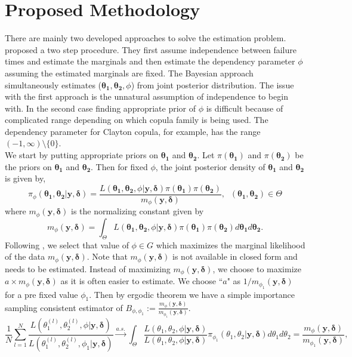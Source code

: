\documentclass[11pt]{article}
\theoremstyle{remboldstyle}
\newcommand{\y}{{\boldsymbol{y}}}
\newcommand{\de}{{\boldsymbol{\delta}}}
\begin{document}
\section{Proposed Methodology}
\label{sec:method}
\noindent
There are mainly two developed approaches to solve the estimation problem. \cite{shih:louis:1995} proposed a two step procedure.  They first assume independence between failure times and estimate the marginals and then estimate the dependency parameter $\phi$ assuming the estimated marginals are fixed. The Bayesian approach simultaneously estimates ($\mathbf{\theta_1}, \mathbf{\theta_2}, \phi$) from joint posterior distribution. The issue with the first approach is the unnatural assumption of independence to begin with. In the second case finding appropriate prior of $\phi$  is difficult because of complicated range depending on which copula family is being used. The dependency parameter for Clayton copula, for example, has the range $ (-1, \infty)\setminus \{0\}$. \\
We start by putting appropriate priors on $\mathbf{\theta_1}$ and $\mathbf{\theta_2}$. Let $\pi(\mathbf{\theta_1})$ and $\pi(\mathbf{\theta_2})$ be the priors on $\mathbf{\theta_1}$ and $\mathbf{\theta_2}$. Then for fixed $\phi$, the joint posterior density of $\mathbf{\theta_1}$ and $\mathbf{\theta_2}$ is given by,
\begin{equation}
  \label{eq:post}
  \pi_\phi(\mathbf{\theta_1}, \mathbf{\theta_2} | \y, \de) = \frac{L(\mathbf{\theta_1}, \mathbf{\theta_2}, \phi| \y, \de) \pi(\mathbf{\theta_1})
\pi(\mathbf{\theta_2})}{m_{\phi}(\y, \de)}, \;\;(\mathbf{\theta_1}, \mathbf{\theta_2}) \in \Theta
\end{equation}
where $m_{\phi}(\y, \de)$ is the normalizing constant given by
\[
m_{\phi}(\y, \de) = \int_{\Theta} L(\mathbf{\theta_1}, \mathbf{\theta_2}, \phi| \y, \de) \pi(\mathbf{\theta_1})\pi(\mathbf{\theta_2}) d\mathbf{\theta_1} d\mathbf{\theta_2}.
\]
Following \cite{roy:2014}, we select that value of $\phi \in G$ which maximizes the marginal likelihood of the data $m_{\phi}(\y, \de)$. Note that $m_{\phi}(\y, \de)$ is not available in closed form and needs to be estimated. Instead of maximizing $m_{\phi}(\y, \de)$, we choose to maximize $a \times m_{\phi}(\y, \de)$ as it is often easier to estimate. We choose ``$a$" as $1/m_{\phi_1}(\y, \de)$ for a pre fixed value $\phi_1$. Then by ergodic theorem we have a simple importance sampling consistent estimator of $B_{\phi,\phi_1}:= \frac{m_{\phi}(\y, \de)}{m_{\phi_1}(\y, \de)}$.
\begin{equation}
  \label{eq:simbf}
\frac{1}{N} \sum_{l=1}^N \frac{L(\theta_1^{(l)}, \theta_2^{(l)}, \phi| \y, \de)}{L(\theta_1^{(l)}, \theta_2^{(l)}, \phi_1| \y, \de)} \stackrel{a.s.}{\rightarrow} \int_{\Theta} \frac{L(\theta_1, \theta_2, \phi| \y, \de)}{L(\theta_1, \theta_2, \phi| \y, \de)} \pi_{\phi_1}(\theta_1, \theta_2| \y, \de) d\theta_1 d\theta_2 =\frac{m_{\phi}(\y, \de)}{m_{\phi_1}(\y, \de)},
\end{equation}
\end{document}
